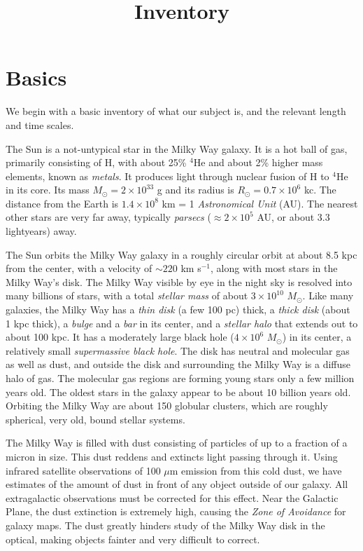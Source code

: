 \title{\bf Inventory}

\section{Basics}

We begin with a basic inventory of what our subject is, and the
relevant length and time scales.

The Sun is a not-untypical star in the Milky Way galaxy. It is a hot
ball of gas, primarily consisting of H, with about 25\% ${}^4$He and
about 2\% higher mass elements, known as {\it metals}. It produces
light through nuclear fusion of H to ${}^4$He in its core. Its mass
$M_\odot = 2\times 10^{33}$ g and its radius is $R_\odot = 0.7 \times
10^6$ kc. The distance from the Earth is $1.4\times 10^8$ km = 1 {\it
  Astronomical Unit} (AU). The nearest other stars are very far away,
typically {\it parsecs} ($\approx 2 \times 10^5$ AU, or about 3.3
lightyears) away.

The Sun orbits the Milky Way galaxy in a roughly circular orbit at
about 8.5 kpc from the center, with a velocity of $\sim 220$ km
s$^{-1}$, along with most stars in the Milky Way's disk. The Milky Way
visible by eye in the night sky is resolved into many billions of
stars, with a total {\it stellar mass} of about $3\times 10^{10}$
$M_\odot$. Like many galaxies, the Milky Way has a {\it thin disk} (a
few 100 pc) thick, a {\it thick disk} (about 1 kpc thick), a {\it
  bulge} and a {\it bar} in its center, and a {\it stellar halo} that
extends out to about 100 kpc. It has a moderately large black hole
($4\times 10^6$ $M_\odot$) in its center, a relatively small {\it
  supermassive black hole}. The disk has neutral and molecular gas as
well as dust, and outside the disk and surrounding the Milky Way is a
diffuse halo of gas. The molecular gas regions are forming young stars
only a few million years old. The oldest stars in the galaxy appear to
be about 10 billion years old. Orbiting the Milky Way are about 150
globular clusters, which are roughly spherical, very old, bound
stellar systems.

The Milky Way is filled with dust consisting of particles of up to a
fraction of a micron in size. This dust reddens and extincts light
passing through it. Using infrared satellite observations of 100
$\mu$m emission from this cold dust, we have estimates of the amount
of dust in front of any object outside of our galaxy. All
extragalactic observations must be corrected for this effect. Near the
Galactic Plane, the dust extinction is extremely high, causing the
{\it Zone of Avoidance} for galaxy maps. The dust greatly hinders
study of the Milky Way disk in the optical, making objects fainter and
very difficult to correct.

